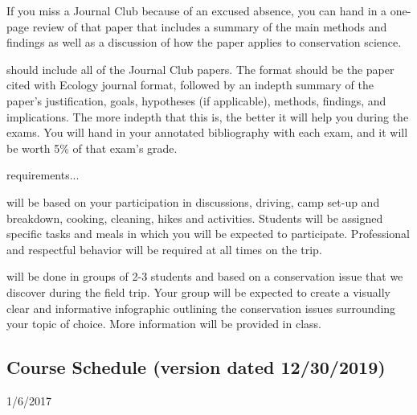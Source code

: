 \documentclass{tufte-handout}
\begin{document}
\begin{fullwidth}
If you miss a Journal Club because of an excused absence, you can hand in a one-page review of that paper that includes a summary of the main methods and findings as well as a discussion of how the paper applies to conservation science. 

 should include all of the Journal Club papers. The format should be the paper cited with Ecology journal format, followed by an indepth summary of the paper's justification, goals, hypotheses (if applicable), methods, findings, and implications. The more indepth that this is, the better it will help you during the exams. You will hand in your annotated bibliography with each exam, and it will be worth 5\% of that exam's grade. 

 requirements...

 will be based on your participation in discussions, driving, camp set-up and breakdown, cooking, cleaning, hikes and activities. Students will be assigned specific tasks and meals in which you will be expected to participate. Professional and respectful behavior will be required at all times on the trip.

 will be done in groups of 2-3 students and based on a conservation issue that we discover during the field trip. Your group will be expected to create a visually clear and informative infographic outlining the conservation issues surrounding your topic of choice. More information will be provided in class.











\newpage
\subsection{Course Schedule (version dated 12/30/2019)}
%


  \setlength{\calwidth}{6.5in}
  \setlength{\calboxdepth}{0.3in}
  \begin{calendar}{1/6/20}{17}

 \skipday%
  \calday[Tuesday]{\classday} %
 \skipday%
  \calday[Thursday]{\classday} %
 \skipday%
    \skipday
    \skipday %



\end{calendar}
\end{fullwidth}
\end{document}
